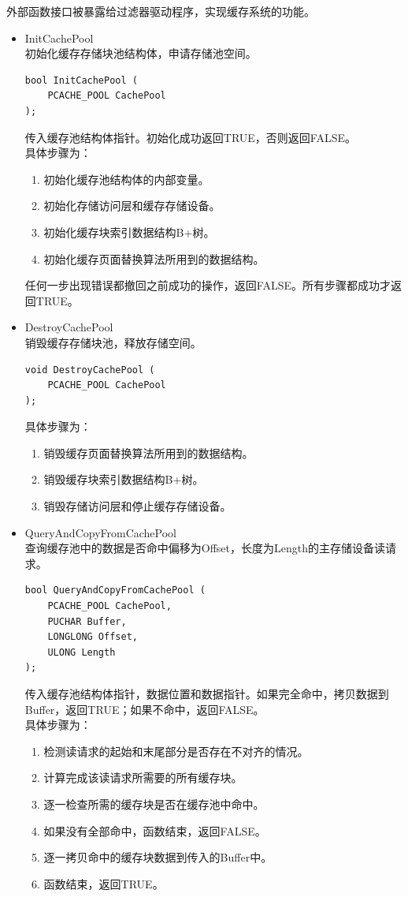 外部函数接口被暴露给过滤器驱动程序，实现缓存系统的功能。

\begin{itemize}

\item InitCachePool
\\初始化缓存存储块池结构体，申请存储池空间。
\begin{lstlisting}
bool InitCachePool (
    PCACHE_POOL CachePool
);
\end{lstlisting}
传入缓存池结构体指针。初始化成功返回TRUE，否则返回FALSE。
\\具体步骤为：
\begin{enumerate}
\item 初始化缓存池结构体的内部变量。
\item 初始化存储访问层和缓存存储设备。
\item 初始化缓存块索引数据结构B+树。
\item 初始化缓存页面替换算法所用到的数据结构。
\end{enumerate}
任何一步出现错误都撤回之前成功的操作，返回FALSE。所有步骤都成功才返回TRUE。

\item DestroyCachePool
\\销毁缓存存储块池，释放存储空间。
\begin{lstlisting}
void DestroyCachePool (
    PCACHE_POOL CachePool
);
\end{lstlisting}
具体步骤为：
\begin{enumerate}
\item 销毁缓存页面替换算法所用到的数据结构。
\item 销毁缓存块索引数据结构B+树。
\item 销毁存储访问层和停止缓存存储设备。
\end{enumerate}

\item QueryAndCopyFromCachePool
\\查询缓存池中的数据是否命中偏移为Offset，长度为Length的主存储设备读请求。
\begin{lstlisting}
bool QueryAndCopyFromCachePool (
    PCACHE_POOL CachePool,
    PUCHAR Buffer,
    LONGLONG Offset,
    ULONG Length
);
\end{lstlisting}
传入缓存池结构体指针，数据位置和数据指针。如果完全命中，拷贝数据到Buffer，返回TRUE；如果不命中，返回FALSE。
\\具体步骤为：
\begin{enumerate}
\item 检测读请求的起始和末尾部分是否存在不对齐的情况。
\item 计算完成该读请求所需要的所有缓存块。
\item 逐一检查所需的缓存块是否在缓存池中命中。
\item 如果没有全部命中，函数结束，返回FALSE。
\item 逐一拷贝命中的缓存块数据到传入的Buffer中。
\item 函数结束，返回TRUE。
\end{enumerate}


\end{itemize}
